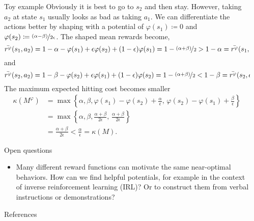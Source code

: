 \documentclass[final]{beamer}
\newlength{\sepwidth}
\newlength{\colwidth}
\newcommand{\separatorcolumn}{\begin{column}{\sepwidth}\end{column}}
\begin{document}
\begin{frame}[t]
\begin{columns}[t]
\begin{column}{\colwidth}
\begin{block}{Toy example}
  Obviously it is best to go to $s_2$ and then stay. However, taking $a_2$ at state $s_1$ usually looks as bad as taking $a_1$. We can differentiate the actions better by shaping with a potential of $\varphi(s_1) \coloneqq 0$ and $\varphi(s_2) \coloneqq \nicefrac{(\alpha - \beta)}{2 \epsilon}$. The shaped mean rewards become, 
  $$ \bar{r^\varphi}(s_1, a_2) = 1 - \alpha - \varphi(s_1) + \epsilon \varphi(s_2) + (1 - \epsilon) \varphi(s_1) = 1 - \nicefrac{(\alpha + \beta)}{2} > 1 - \alpha = \bar{r^\varphi}(s_1, a_1) $$
  and 
  $$ \bar{r^\varphi}(s_2, a_2) = 1 - \beta - \varphi(s_2) + \epsilon \varphi(s_1) + (1 - \epsilon) \varphi(s_2) = 1 - \nicefrac{(\alpha + \beta)}{2} < 1 - \beta = \bar{r^\varphi}(s_2, a_1). $$
  The maximum expected hitting cost becomes smaller
  \begin{align*}
    \kappa(M^\varphi) &= \max \left\{ \alpha, \beta, \varphi(s_1) - \varphi(s_2) + \frac{\alpha}{\epsilon}, \, \varphi(s_2) - \varphi(s_1) + \frac{\beta}{\epsilon} \right\} \\
    &= \max \left\{ \alpha, \beta, \frac{\alpha + \beta}{2 \epsilon}, \, \frac{\alpha + \beta}{2 \epsilon} \right\} \\
    &= \frac{\alpha + \beta}{2 \epsilon} < \frac{\alpha}{\epsilon} = \kappa(M).
  \end{align*}
  \end{block}

  \begin{block}{Open questions}
  \begin{itemize}
      \item Many different reward functions can motivate the same near-optimal behaviors. How can we find helpful potentials, for example in the context of inverse reinforcement learning (IRL)? Or to construct them from verbal instructions or demonstrations?
  \end{itemize}
  \end{block}

  \begin{block}{References}

    \nocite{*}
    \footnotesize{}

  \end{block}

\end{column}

\separatorcolumn
\end{columns}

\end{frame}
\end{document}
